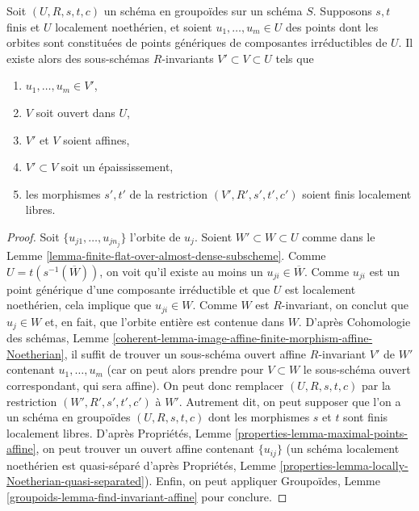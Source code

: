 \begin{lemma}
\label{lemma-invariant-affine-open-around-generic-point-Noetherian}
Soit $(U, R, s, t, c)$ un schéma en groupoïdes sur un schéma $S$.
Supposons $s, t$ finis et $U$ localement noethérien, et soient $u_1, \ldots, u_m \in U$
des points dont les orbites sont constituées de points génériques de
composantes irréductibles de $U$. Il existe alors des sous-schémas $R$-invariants
$V' \subset V \subset U$ tels que
\begin{enumerate}
\item $u_1, \ldots, u_m \in V'$,
\item $V$ soit ouvert dans $U$,
\item $V'$ et $V$ soient affines,
\item $V' \subset V$ soit un épaississement,
\item les morphismes $s', t'$ de la restriction $(V', R', s', t', c')$
soient finis localement libres.
\end{enumerate}
\end{lemma}

\begin{proof}
Soit $\{u_{j1}, \ldots, u_{jn_j}\}$ l'orbite de $u_j$.
Soient $W' \subset W \subset U$ comme dans le
Lemme \ref{lemma-finite-flat-over-almost-dense-subscheme}.
Comme $U = t(s^{-1}(\overline{W}))$, on voit qu'il existe au moins
un $u_{ji} \in \overline{W}$. Comme $u_{ji}$ est un point générique
d'une composante irréductible et que $U$ est localement noethérien,
cela implique que $u_{ji} \in W$. Comme $W$ est $R$-invariant, on
conclut que $u_j \in W$ et, en fait, que l'orbite entière est contenue dans $W$.
D'après Cohomologie des schémas, Lemme
\ref{coherent-lemma-image-affine-finite-morphism-affine-Noetherian},
il suffit de trouver un sous-schéma ouvert affine $R$-invariant $V'$
de $W'$ contenant $u_1, \ldots, u_m$ (car on peut alors prendre pour $V \subset W$
le sous-schéma ouvert correspondant, qui sera affine).
On peut donc remplacer $(U, R, s, t, c)$
par la restriction $(W', R', s', t', c')$ à $W'$.
Autrement dit, on peut supposer que l'on a un schéma en groupoïdes $(U, R, s, t, c)$
dont les morphismes $s$ et $t$ sont finis localement libres.
D'après Propriétés, Lemme \ref{properties-lemma-maximal-points-affine},
on peut trouver un ouvert affine contenant $\{u_{ij}\}$
(un schéma localement noethérien est quasi-séparé d'après
Propriétés, Lemme \ref{properties-lemma-locally-Noetherian-quasi-separated}).
Enfin, on peut appliquer
Groupoïdes, Lemme \ref{groupoids-lemma-find-invariant-affine}
pour conclure.
\end{proof}

